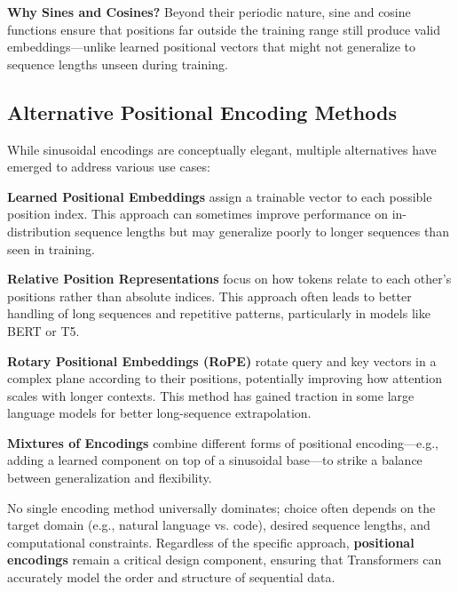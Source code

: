 \noindent
\textbf{Why Sines and Cosines?} Beyond their periodic nature, sine and cosine functions ensure that positions far outside the training range still produce valid embeddings—unlike learned positional vectors that might not generalize to sequence lengths unseen during training.

\subsection{Alternative Positional Encoding Methods}
\noindent
While sinusoidal encodings are conceptually elegant, multiple alternatives have emerged to address various use cases:

\textbf{Learned Positional Embeddings} assign a trainable vector to each possible position index. This approach can sometimes improve performance on in-distribution sequence lengths but may generalize poorly to longer sequences than seen in training.

\textbf{Relative Position Representations} focus on how tokens relate to each other's positions rather than absolute indices. This approach often leads to better handling of long sequences and repetitive patterns, particularly in models like BERT or T5.

\textbf{Rotary Positional Embeddings (RoPE)} rotate query and key vectors in a complex plane according to their positions, potentially improving how attention scales with longer contexts. This method has gained traction in some large language models for better long-sequence extrapolation.

\textbf{Mixtures of Encodings} combine different forms of positional encoding—e.g., adding a learned component on top of a sinusoidal base—to strike a balance between generalization and flexibility.

\noindent
No single encoding method universally dominates; choice often depends on the target domain (e.g., natural language vs. code), desired sequence lengths, and computational constraints. Regardless of the specific approach, \textbf{positional encodings} remain a critical design component, ensuring that Transformers can accurately model the order and structure of sequential data.
